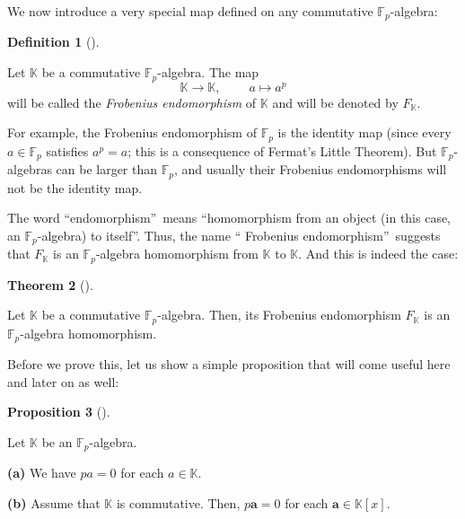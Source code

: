 \documentclass[numbers=enddot,12pt,final,onecolumn,notitlepage]{scrartcl}%
\theoremstyle{definition}
\newtheorem{theo}{Theorem}[subsection]
\newenvironment{theorem}[1][]
{\begin{theo}[#1]\begin{leftbar}}
{\end{leftbar}\end{theo}}
\newtheorem{prop}[theo]{Proposition}
\newenvironment{proposition}[1][]
{\begin{prop}[#1]\begin{leftbar}}
{\end{leftbar}\end{prop}}
\newtheorem{defi}[theo]{Definition}
\newenvironment{definition}[1][]
{\begin{defi}[#1]\begin{leftbar}}
{\end{leftbar}\end{defi}}
\begin{document}
We now introduce a very special map defined on any commutative $\mathbb{F}%
_{p}$-algebra:

\begin{definition}
\label{def.Frob}Let $\mathbb{K}$ be a commutative $\mathbb{F}_{p}$-algebra.
The map%
\[
\mathbb{K}\rightarrow\mathbb{K},\ \ \ \ \ \ \ \ \ \ a\mapsto a^{p}%
\]
will be called the \textit{Frobenius endomorphism} of $\mathbb{K}$ and will be
denoted by $F_{\mathbb{K}}$.
\end{definition}

For example, the Frobenius endomorphism of $\mathbb{F}_{p}$ is the identity
map (since every $a\in\mathbb{F}_{p}$ satisfies $a^{p}=a$; this is a
consequence of Fermat's Little Theorem). But $\mathbb{F}_{p}$-algebras can be
larger than $\mathbb{F}_{p}$, and usually their Frobenius endomorphisms will
not be the identity map.

The word \textquotedblleft endomorphism\textquotedblright\ means
\textquotedblleft homomorphism from an object (in this case, an $\mathbb{F}%
_{p}$-algebra) to itself\textquotedblright. Thus, the name \textquotedblleft
Frobenius endomorphism\textquotedblright\ suggests that $F_{\mathbb{K}}$ is an
$\mathbb{F}_{p}$-algebra homomorphism from $\mathbb{K}$ to $\mathbb{K}$. And
this is indeed the case:

\begin{theorem}
\label{thm.Frob.end}Let $\mathbb{K}$ be a commutative $\mathbb{F}_{p}%
$-algebra. Then, its Frobenius endomorphism $F_{\mathbb{K}}$ is an
$\mathbb{F}_{p}$-algebra homomorphism.
\end{theorem}

Before we prove this, let us show a simple proposition that will come useful
here and later on as well:

\begin{proposition}
\label{prop.Fp-alg.p=0}Let $\mathbb{K}$ be an $\mathbb{F}_{p}$-algebra.

\textbf{(a)} We have $pa=0$ for each $a\in\mathbb{K}$.

\textbf{(b)} Assume that $\mathbb{K}$ is commutative. Then, $p\mathbf{a}=0$
for each $\mathbf{a}\in\mathbb{K}\left[  x\right]  $.
\end{proposition}
\end{document}
